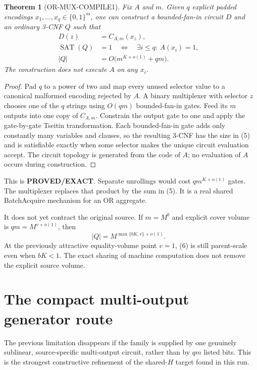 \documentclass[11pt]{article}
\newcommand{\SAT}{\operatorname{SAT}}
\newcommand{\PROVED}{\textcolor{proved}{\textbf{PROVED/EXACT}}}
\newtheorem{theorem}{Theorem}
\begin{document}
\begin{theorem}[OR-MUX-COMPILE1]
Fix $A$ and $m$.  Given $q$ explicit padded encodings
$x_1,\ldots,x_q\in\{0,1\}^m$, one can construct a bounded-fan-in circuit $D$
and an ordinary 3-CNF $Q$ such that
\begin{align}
 D(z)&=C_{A,m}(x_z),\\
 \SAT(Q)&=1\quad\Longleftrightarrow\quad
 \exists i\le q:\ A(x_i)=1,                            \tag{4}\\
 |Q|&=O\bigl(m^{K+o(1)}+qm\bigr).                       \tag{5}
\end{align}
The construction does not execute $A$ on any $x_i$.
\end{theorem}

\begin{proof}
Pad $q$ to a power of two and map every unused selector value to a canonical
malformed encoding rejected by $A$.  A binary multiplexer with selector $z$
chooses one of the $q$ strings using $O(qm)$ bounded-fan-in gates.  Feed its
$m$ outputs into one copy of $C_{A,m}$.  Constrain the output gate to one and
apply the gate-by-gate Tseitin transformation.  Each bounded-fan-in gate adds
only constantly many variables and clauses, so the resulting 3-CNF has the
size in (5) and is satisfiable exactly when some selector makes the unique
circuit evaluation accept.  The circuit topology is generated from the code
of $A$; no evaluation of $A$ occurs during construction.
\end{proof}

This is \PROVED.  Separate unrollings would cost $qm^{K+o(1)}$ gates.  The
multiplexer replaces that product by the sum in (5).  It is a real shared
BatchAcquire mechanism for an OR aggregate.

It does not yet contract the original source.  If $m=M^b$ and explicit cover
volume is $qm=M^{v+o(1)}$, then
\begin{equation}
 |Q|=M^{\max\{bK,v\}+o(1)}.                              \tag{6}
\end{equation}
At the previously attractive equality-volume point $v=1$, (6) is still
parent-scale even when $bK<1$.  The exact sharing of machine computation does
not remove the explicit source volume.

\section{The compact multi-output generator route}

The previous limitation disappears if the family is supplied by one genuinely
sublinear, source-specific multi-output circuit, rather than by $qm$ listed
bits.  This is the strongest constructive refinement of the shared-$H$ target
found in this run.
\end{document}
